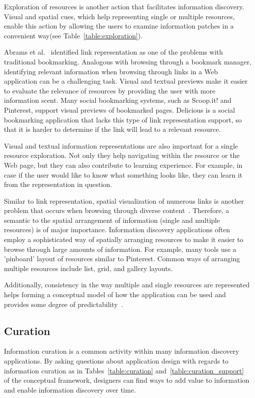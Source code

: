 {{Exploration of resources is another action that facilitates information discovery. Visual and spatial cues, which help representing single or multiple resources, enable this action by allowing the users to examine information patches in a convenient way(see Table~\ref{table:exploration}). 

Abrams et al.~\cite{abrams1998information} identified link representation as one of the problems with traditional bookmarking. Analogous with browsing through a bookmark manager, identifying relevant information when browsing through links in a Web application can be a challenging task. Visual and textual previews make it easier to evaluate the relevance of resources by providing the user with more information scent. Many social bookmarking systems, such as Scoop.it! and Pinterest, support visual previews of bookmarked pages. Delicious is a social bookmarking application that lacks this type of link representation support, so that it is harder to determine if the link will lead to a relevant resource.

Visual and textual information representations are also important for a single resource exploration. Not only they help navigating within the resource or the Web page, but they can also contribute to learning experience. For example, in case if the user would like to know what something looks like, they can learn it from the representation in question.  

Similar to link representation, spatial visualization of numerous links is another problem that occurs when browsing through diverse content~\cite{abrams1998information}. Therefore, a semantic to the spatial arrangement of information (single and multiple resources) is of major importance. Information discovery applications often employ a sophisticated way of spatially arranging resources to make it easier to browse through large amounts of information. For example, many tools use a 'pinboard' layout of resources similar to Pinterest. Common ways of arranging multiple resources include list, grid, and gallery layouts. 

Additionally, consistency in the way multiple and single resources are represented helps forming a conceptual model of how the application can be used and provides some degree of predictability~\cite{norman2002design}.
} %

{\subsection{Curation}
Information curation is a common activity within many information discovery applications. By asking questions about application design with regards to information curation as in Tables~\ref{table:curation} and~\ref{table:curation_support} of the conceptual framework, designers can find ways to add value to information and enable information discovery over time.

}}
